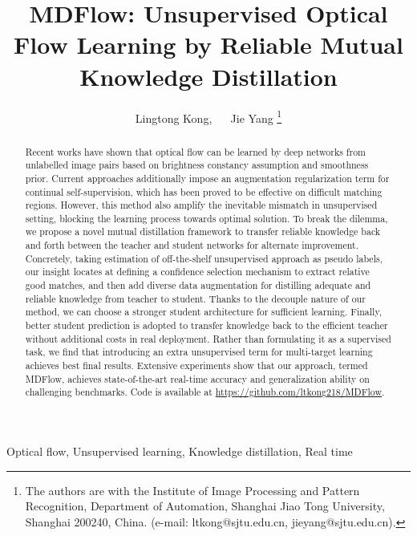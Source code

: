 \documentclass[lettersize,journal]{IEEEtran}
\begin{document}
\title{MDFlow: Unsupervised Optical Flow Learning by Reliable Mutual Knowledge Distillation}

\author{Lingtong Kong, ~~ Jie Yang
	\thanks{The authors are with the Institute of Image Processing and Pattern Recognition, Department of Automation, Shanghai Jiao Tong University, Shanghai 200240, China. (e-mail: ltkong@sjtu.edu.cn, jieyang@sjtu.edu.cn).}
}





\maketitle

\begin{abstract}
	Recent works have shown that optical flow can be learned by deep networks from unlabelled image pairs based on brightness constancy assumption and smoothness prior. Current approaches additionally impose an augmentation regularization term for continual self-supervision, which has been proved to be effective on difficult matching regions. However, this method also amplify the inevitable mismatch in unsupervised setting, blocking the learning process towards optimal solution. To break the dilemma, we propose a novel mutual distillation framework to transfer reliable knowledge back and forth between the teacher and student networks for alternate improvement. Concretely, taking estimation of off-the-shelf unsupervised approach as pseudo labels, our insight locates at defining a confidence selection mechanism to extract relative good matches, and then add diverse data augmentation for distilling adequate and reliable knowledge from teacher to student. Thanks to the decouple nature of our method, we can choose a stronger student architecture for sufficient learning. Finally, better student prediction is adopted to transfer knowledge back to the efficient teacher without additional costs in real deployment. Rather than formulating it as a supervised task, we find that introducing an extra unsupervised term for multi-target learning achieves best final results. Extensive experiments show that our approach, termed MDFlow, achieves state-of-the-art real-time accuracy and generalization ability on challenging benchmarks. Code is available at \url{https://github.com/ltkong218/MDFlow}.
\end{abstract}

\begin{IEEEkeywords}
	Optical flow, Unsupervised learning, Knowledge distillation, Real time
\end{IEEEkeywords}
\end{document}
